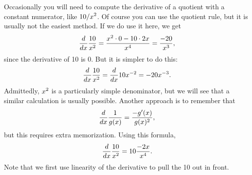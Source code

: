 Occasionally you will need to compute the derivative of a quotient
with a constant numerator, like $\displaystyle 10/x^2$. Of course you can use the
quotient rule, but it is usually not the easiest method. If we do use
it here, we get 
$${d\over dx}{10\over x^2}={x^2\cdot 0-10\cdot 2x\over x^4}=
{-20\over x^3},$$
since the derivative of 10 is 0. But it is simpler to do this:
$${d\over dx}{10\over x^2}={d\over dx}10x^{-2}=-20x^{-3}.$$
Admittedly, $\displaystyle x^2$ is a particularly simple denominator, but we will
see that a similar calculation is usually possible. Another approach
is to remember that
$${d\over dx}{1\over g(x)}={-g'(x)\over g(x)^2},$$
but this requires extra memorization. Using this formula,
$${d\over dx}{10\over x^2}=10{-2x\over x^4}.$$
Note that we first use linearity of the derivative to pull the 10 out
in front.


